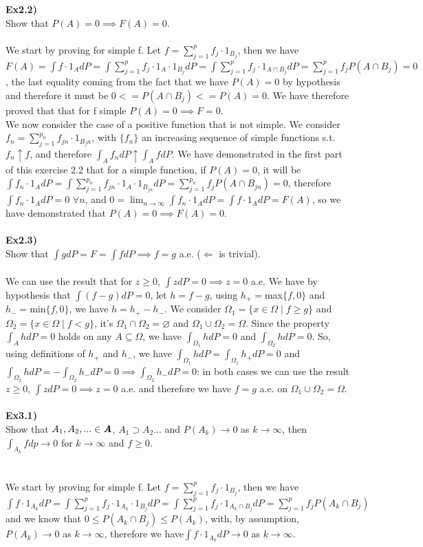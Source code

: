 \documentclass[12pt,mythesisstyle]{report}
\begin{document}
\textbf{Ex2.2)}\\
Show that $P(A)=0\implies F(A)=0$.
\\
\\We start by proving for simple f. Let $f=\sum_{j=1}^p f_j\cdot 1_{B_j}$, then we have $F(A)=\int f\cdot 1_{A}dP=\int \sum_{j=1}^p f_j\cdot 1_A\cdot 1_{B_j}dP=\int \sum_{j=1}^p f_j\cdot 1_{A\cap B_j}dP=\sum_{j=1}^p f_jP(A\cap B_j)=0$, the last equality coming from the fact that we have $P(A)=0$ by hypothesis and therefore it must be $0<=P(A\cap B_j)<=P(A)=0$. We have therefore proved that that for f simple $P(A)=0\implies F=0$.
\\We now consider the case of a positive function that is not simple. We consider $f_n=\sum_{j=1}^{p_n} f_{jn}\cdot 1_{B_jn}$, with $\{f_n\}$ an increasing sequence of simple functions s.t. $f_n\uparrow f$, and therefore $\int_A f_ndP\uparrow\int_A fdP$. We have demonstrated in the first part of this exercise 2.2 that for a simple function, if $P(A)=0$, it will be $\int f_n\cdot 1_{A}dP=\int \sum_{j=1}^{p_n} f_{jn}\cdot 1_A\cdot 1_{B_{jn}}dP=\sum_{j=1}^{p_n} f_jP(A\cap B_{jn})=0$, therefore $\int f_n\cdot 1_{A}dP=0$ $\forall n$, and $0=\lim_{n \to \infty}\int f_n\cdot 1_{A}dP=\int f\cdot 1_{A}dP=F(A)$, so we have demonstrated that $P(A)=0\implies F(A)=0$.
\\\\
\textbf{Ex2.3)}\\
Show that $\int gdP=F=\int fdP\implies f=g$ a.e. ($\Longleftarrow$ is trivial).
\\\\
We can use the result that for $z\geq 0$, $\int zdP=0 \implies z=0$ a.e. We have by hypothesis that $\int (f-g)dP=0$, let $h=f-g$, using $h_+=$max$\{f,0\}$ and $h_-=$min$\{f,0\}$, we have $h=h_+-h_-$. We consider $\Omega_1=\{x\in\Omega \mid f\geq g\}$ and $\Omega_2=\{x\in\Omega \mid f<g\}$, it's $\Omega_1\cap\Omega_2=\varnothing$ and $\Omega_1\cup\Omega_2=\Omega$. Since the property $\int_A hdP=0$ holds on any $A\subseteq\Omega$, we have $\int_{\Omega_1} hdP=0$ and $\int_{\Omega_2} hdP=0$. So, using definitions of $h_+$ and $h_-$, we have $\int_{\Omega_1} hdP=\int_{\Omega_1} h_+dP=0$ and $\int_{\Omega_2} hdP=-\int_{\Omega_2} h_-dP=0\implies\int_{\Omega_2} h_-dP=0$: in both cases we can use the result $z\geq 0$, $\int zdP=0 \implies z=0$ a.e. and therefore we have $f=g$ a.e. on $\Omega_1\cup\Omega_2=\Omega$.
\\\\
\textbf{Ex3.1)}\\
Show that $A_1, A_2,...\in\textbf{\textit{A}}$, $A_1\supset A_2...$ and $P(A_k)\rightarrow 0$ as $k\rightarrow\infty$, then $\int_{A_k}fdp\rightarrow0$ for $k\rightarrow\infty$ and $f\geq 0$.
\\\\
\\We start by proving for simple f. Let $f=\sum_{j=1}^p f_j\cdot 1_{B_j}$, then we have $\int f\cdot 1_{A_k}dP=\int \sum_{j=1}^p f_j\cdot 1_{A_k}\cdot 1_{B_j}dP=\int \sum_{j=1}^p f_j\cdot 1_{A_k\cap B_j}dP=\sum_{j=1}^p f_jP(A_k\cap B_j)$ and we know that $0\leq P(A_k\cap B_j)\leq P(A_k)$, with, by assumption, $P(A_k)\rightarrow 0$ as $k\rightarrow\infty$, therefore we have$\int f\cdot 1_{A_k}dP\rightarrow 0$ as $k\rightarrow\infty$.
\\
\end{document}

